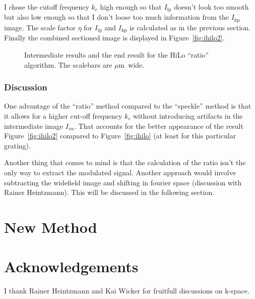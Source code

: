 \documentclass[11pt,abstracton,titlepage]{scrartcl}
\newcommand{\figref}[1]{Figure~\ref{#1}}
\begin{document}
I chose the cutoff frequency $k_c$ high enough so that $I_\textrm{lp}$
doesn't look too smooth but also low enough so that I don't loose too
much information from the $I_\textrm{hp}$ image. The scale factor
$\eta$ for $I_\textrm{lp}$ and $I_\textrm{hp}$ is calculated as in the
previous section. Finally the combined sectioned image is displayed in
\figref{fig:ihilo2}.

\begin{figure}[htb]
  \centering
  \caption{Intermediate results and the end result for the HiLo
    ``ratio'' algorithm. The scalebars are \unit[2]{$\mu$m} wide.}
  \label{fig:hilo2_2}
\end{figure}
\subsubsection*{Discussion}
One advantage of the ``ratio'' method compared to the ``speckle''
method is that it allows for a higher cut-off frequency $k_c$ without
introducing artifacts in the intermediate image $I_{su}$. That
accounts for the better appearance of the result \figref{fig:ihilo2}
compared to \figref{fig:ihilo} (at least for this particular grating).


Another thing that comes to mind is that the calculation of the ratio
isn't the only way to extract the modulated signal. Another approach
would involve subtracting the widefield image and shifting in fourier
space (discussion with Rainer Heintzmann). This will be discussed in
the following section.
\section{New Method}

\section{Acknowledgements}
I thank Rainer Heintzmann and Kai Wicker for fruitfull discussions
on k-space.



\end{document}
